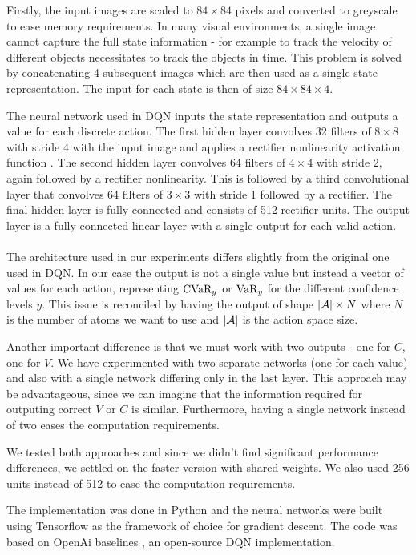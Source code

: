 Firstly, the input images are scaled to $84\times84$ pixels and converted to greyscale to ease memory requirements. In many visual environments, a single image cannot capture the full state information - for example to track the velocity of different objects necessitates to track the objects in time. This problem is solved by concatenating 4 subsequent images which are then used as a single state representation. The input for each state is then of size $84\times84\times4$.

The neural network used in DQN inputs the state representation and outputs a value for each discrete action. The first hidden layer convolves 32 filters of $8\times8$ with stride 4 with the input image and applies a rectifier nonlinearity activation function \citep{jarrett2009best}. The second hidden layer convolves 64 filters of $4\times4$ with stride 2, again followed by a rectifier nonlinearity. This is followed by a third convolutional layer that convolves 64 filters of $3\times3$ with stride 1 followed by a rectifier. The final hidden layer is fully-connected and consists of 512 rectifier units. The output layer is a fully-connected linear layer with a single output for each valid action.
\\
\\
The architecture used in our experiments differs slightly from the original one used in DQN. In our case the output is not a single value but instead a vector of values for each action, representing $\text{CVaR}_y$ or $\text{VaR}_y$ for the different confidence levels $y$. This issue is reconciled by having the output of shape $|\mathcal{A}|\times N$ where $N$ is the number of atoms we want to use and $|\mathcal{A}|$ is the action space size.

Another important difference is that we must work with two outputs - one for $C$, one for $V$. We have experimented with two separate networks (one for each value) and also with a single network differing only in the last layer. This approach may be advantageous, since we can imagine that the information required for outputing correct $V$ or $C$ is similar. Furthermore, having a single network instead of two eases the computation requirements.

We tested both approaches and since we didn't find significant performance differences, we settled on the faster version with shared weights. We also used 256 units instead of 512 to ease the computation requirements.

The implementation was done in Python and the neural networks were built using Tensorflow \citep{abadi2016tensorflow} as the framework of choice for gradient descent. The code was based on OpenAi baselines \citep{baselines}, an open-source DQN implementation.

